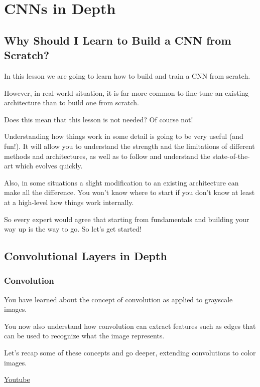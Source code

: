 \chapter{CNNs in Depth}


\section{Why Should I Learn to Build a CNN from Scratch?}
In this lesson we are going to learn how to build and train a CNN from scratch.

However, in real-world situation, it is far more common to fine-tune an existing architecture than to build one from scratch.

Does this mean that this lesson is not needed? Of course not!

Understanding how things work in some detail is going to be very useful (and fun!). It will allow you to understand the strength and the limitations of different methods and architectures, as well as to follow and understand the state-of-the-art which evolves quickly.

Also, in some situations a slight modification to an existing architecture can make all the difference. You won't know where to start if you don't know at least at a high-level how things work internally.

So every expert would agree that starting from fundamentals and building your way up is the way to go. So let’s get started!

\section{Convolutional Layers in Depth}

\subsection{Convolution}

You have learned about the concept of convolution as applied to grayscale images. \newline

You now also understand how convolution can extract features such as edges that can be used to recognize what the image represents. \newline

Let's recap some of these concepts and go deeper, extending convolutions to color images. \newline

\href{https://www.youtube.com/watch?v=Cq7rqxi_x3I&t=2s&ab_channel=Udacity}{Youtube} \newline

